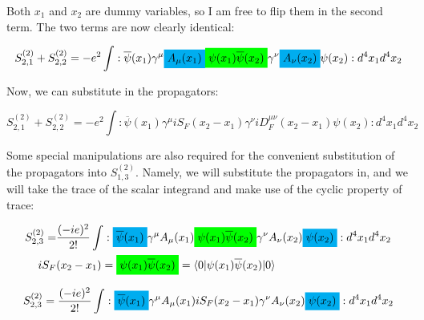 \documentclass[a4]{article}
\newcommand{\highlight}[2][yellow]{\mathchoice
  {\colorbox{#1}{$\displaystyle#2$}}
  {\colorbox{#1}{$\textstyle#2$}}
  {\colorbox{#1}{$\scriptstyle#2$}}
  {\colorbox{#1}{$\scriptscriptstyle#2$}}}
\begin{document}
        Both $x_1$ and $x_2$ are dummy variables, so I am free to flip them in the second term. The two terms are now clearly identical:

        \begin{equation}
            S^{(2)}_{2,1} + S^{(2)}_{2,2} = - e^{2} \int :\overline{\psi} (x_1) \gamma^{\mu} \highlight[cyan]{A_{\mu} (x_1)} \highlight[green]{\psi (x_1) \overline{\psi} (x_2)} \gamma^{\nu} \highlight[cyan]{A_{\nu} (x_2)} \psi (x_2): d^{4} x_{1} d^{4} x_{2}
        \end{equation}

        Now, we can substitute in the propagators:

        \begin{framed}
            \begin{equation}
                S^{(2)}_{2,1} + S^{(2)}_{2,2} = - e^{2} \int :\overline{\psi} (x_1) \gamma^{\mu} i S_{F} (x_2 - x_1) \gamma^{\nu} i D_{F}^{\mu\nu} (x_2 - x_1) \psi (x_2): d^{4} x_{1} d^{4} x_{2}
            \end{equation}
        \end{framed}

        Some special manipulations are also required for the convenient substitution of the propagators into $S^{(2)}_{1,3}$. Namely, we will substitute the propagators in, and we will take
        the trace of the scalar integrand and make use of the cyclic property of trace:

        \begin{equation}
            \begin{aligned}
            S^{(2)}_{2,3} = & \frac{(-ie)^2}{2!} \int :\highlight[cyan]{\overline{\psi} (x_1)} \gamma^{\mu} A_{\mu} (x_1) \highlight[green]{\psi (x_1) \overline{\psi} (x_2)} \gamma^{\nu} A_{\nu} (x_2)  \highlight[cyan]{\psi (x_2)}: d^{4} x_{1} d^{4} x_{2} \\
            i S_{F} & (x_2 - x_1) = \highlight[green]{\psi (x_1) \overline{\psi} (x_2)} = \braket{0|\psi (x_1) \overline{\psi} (x_2)|0}
            \end{aligned}
        \end{equation}

        \begin{equation}
            S^{(2)}_{2,3} = \frac{(-ie)^2}{2!} \int :\highlight[cyan]{\overline{\psi} (x_1)} \gamma^{\mu} A_{\mu} (x_1) i S_{F} (x_2 - x_1) \gamma^{\nu} A_{\nu} (x_2)  \highlight[cyan]{\psi (x_2)}: d^{4} x_{1} d^{4} x_{2}
        \end{equation}
\end{document}
